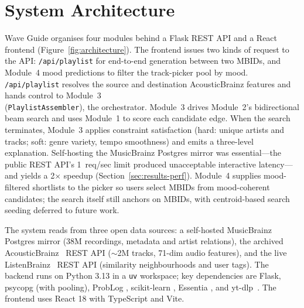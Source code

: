 \section{System Architecture}

Wave Guide organises four modules behind a Flask REST API and a React frontend (Figure~\ref{fig:architecture}). The frontend issues two kinds of request to the API: \texttt{/api/playlist} for end-to-end generation between two MBIDs, and Module~4 mood predictions to filter the track-picker pool by mood. \texttt{/api/playlist} resolves the source and destination AcousticBrainz features and hands control to Module~3 \\(\texttt{PlaylistAssembler}), the orchestrator. Module~3 drives Module~2's bidirectional beam search and uses Module~1 to score each candidate edge. When the search terminates, Module~3 applies constraint satisfaction (hard: unique artists and tracks; soft: genre variety, tempo smoothness) and emits a three-level explanation. Self-hosting the MusicBrainz Postgres mirror was essential---the public REST API's 1~req/sec limit produced unacceptable interactive latency---and yields a 2$\times$ speedup (Section~\ref{sec:results-perf}). Module~4 supplies mood-filtered shortlists to the picker so users select MBIDs from mood-coherent candidates; the search itself still anchors on MBIDs, with centroid-based search seeding deferred to future work.

The system reads from three open data sources: a self-hosted MusicBrainz~\cite{musicbrainz2024} Postgres mirror (38M recordings, metadata and artist relations), the archived AcousticBrainz~\cite{acousticbrainz2022} REST API ($\sim$2M tracks, 71-dim audio features), and the live ListenBrainz~\cite{listenbrainz2024} REST API (similarity neighbourhoods and user tags). The backend runs on Python 3.13 in a \texttt{uv} workspace; key dependencies are Flask, psycopg (with pooling), ProbLog \cite{deraedt2007}, scikit-learn \cite{scikit2011}, Essentia \cite{bogdanov2013}, and yt-dlp~\cite{ytdlp2024}. The frontend uses React 18 with TypeScript and Vite.

